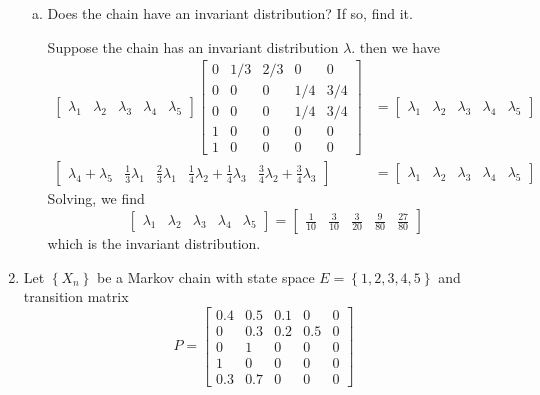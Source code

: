 \documentclass{article}
\begin{document}
\begin{enumerate}
\begin{enumerate}[(a)]
			\item Does the chain have an invariant distribution? If so, find it.
				\begin{soln}
					Suppose the chain has an invariant distribution $\lambda.$ then we have
					\begin{align*}
						\begin{bmatrix}
							\lambda_1 & \lambda_2 & \lambda_3 & \lambda_4 & \lambda_5
						\end{bmatrix}\begin{bmatrix}
							0 & 1/3 & 2/3 & 0 & 0 \\
							0 & 0 & 0 & 1/4 & 3/4 \\
							0 & 0 & 0 & 1/4 & 3/4 \\
							1 & 0 & 0 & 0 & 0 \\
							1 & 0 & 0 & 0 & 0
						\end{bmatrix}&=\begin{bmatrix}
							\lambda_1 & \lambda_2 & \lambda_3 & \lambda_4 & \lambda_5
						\end{bmatrix} \\
						\begin{bmatrix}
							\lambda_4+\lambda_5 & \frac{1}{3}\lambda_1 & \frac{2}{3}\lambda_1 & \frac{1}{4}\lambda_2 + \frac{1}{4}\lambda_3 & \frac{3}{4}\lambda_2+\frac{3}{4}\lambda_3
						\end{bmatrix} &= \begin{bmatrix}
							\lambda_1 & \lambda_2 & \lambda_3 & \lambda_4 & \lambda_5
						\end{bmatrix}
					\end{align*}
					Solving, we find
					\[\begin{bmatrix}
							\lambda_1 & \lambda_2 & \lambda_3 & \lambda_4 & \lambda_5
						\end{bmatrix} = \begin{bmatrix}
							\frac{1}{10} & \frac{3}{10} & \frac{3}{20} & \frac{9}{80} & \frac{27}{80}
					\end{bmatrix}\]
					which is the invariant distribution.
				\end{soln}

		\end{enumerate}

	\item Let $\left\{ X_n \right\}$ be a Markov chain with state space $E=\left\{ 1, 2, 3, 4, 5 \right\}$ and transition matrix
		\[P=\begin{bmatrix}
				0.4 & 0.5 & 0.1 & 0 & 0 \\
				0 & 0.3 & 0.2 & 0.5 & 0 \\
				0 & 1 & 0 & 0 & 0 \\
				1 & 0 & 0 & 0 & 0 \\
				0.3 & 0.7 & 0 & 0 & 0
		\end{bmatrix}\]


\end{enumerate}
\end{document}
